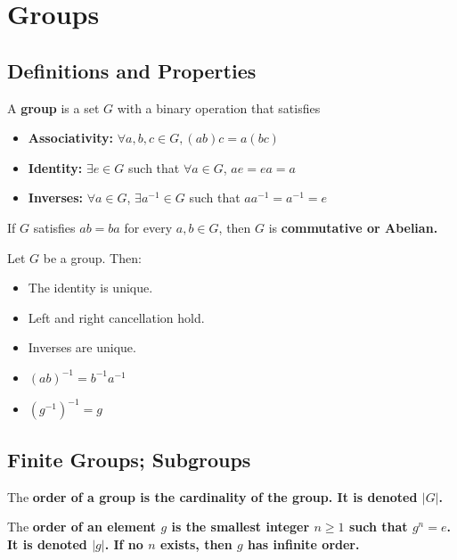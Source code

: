 \documentclass{hmwk}
\begin{document}
\section{Groups}
\subsection{Definitions and Properties}

\begin{defn}
A \textbf{group} is a set $G$ with a binary operation that satisfies \begin{itemize}
    \item \textbf{Associativity:} $\forall a, b, c \in G, (ab)c = a(bc)$
    \item \textbf{Identity:} $\exists e \in G$ such that $\forall a \in G$, $ae = ea = a$
    \item \textbf{Inverses:} $\forall a \in G$, $\exists a^{-1} \in G$ such that $aa^{-1} = a^{-1} = e$
\end{itemize}

\noindent If $G$ satisfies $ab = ba$ for every $a, b \in G$, then $G$ is \bf{commutative} or \bf{Abelian}.
\end{defn}

\begin{prop}
Let $G$ be a group. Then:
\begin{itemize}
    \item The identity is unique.
    \item Left and right cancellation hold.
    \item Inverses are unique.
    \item $(ab)^{-1} = b^{-1}a^{-1}$
    \item $(g^{-1})^{-1} = g$
\end{itemize}
\end{prop}

\subsection{Finite Groups; Subgroups}

\begin{defn}
The \bf{order of a group} is the cardinality of the group. It is denoted $|G|$.
\end{defn}

\begin{defn}
The \bf{order of an element} $g$ is the smallest integer $n \geq 1$ such that $g^n = e$. It is denoted $|g|$. If no $n$ exists, then $g$ has infinite order. 
\end{defn}
\end{document}
